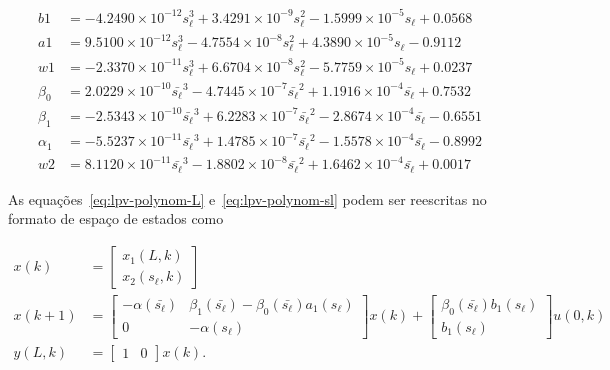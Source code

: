 \begin{equation}
	\label{eq:lpv-fs9}
	\begin{aligned}
		b1       & = -4.2490\times{}10^{-12} s_\ell^3 + 3.4291\times{}10^{-9} s_\ell^2 - 1.5999\times{}10^{-5} s_\ell + 0.0568                               \\
		a1       & = 9.5100\times{}10^{-12} s_\ell^3 - 4.7554\times{}10^{-8} s_\ell^2 + 4.3890\times{}10^{-5} s_\ell - 0.9112                                \\
		w1       & = -2.3370\times{}10^{-11} s_\ell^3 + 6.6704\times{}10^{-8} s_\ell^2 - 5.7759\times{}10^{-5} s_\ell + 0.0237                               \\
		\beta_0  & = 2.0229\times{}10^{-10} \bar{s_\ell}^3 - 4.7445\times{}10^{-7} \bar{s_\ell}^2 + 1.1916\times{}10^{-4} \bar{s_\ell} + 0.7532  \\
		\beta_1  & = -2.5343\times{}10^{-10} \bar{s_\ell}^3 + 6.2283\times{}10^{-7} \bar{s_\ell}^2 - 2.8674\times{}10^{-4} \bar{s_\ell} - 0.6551 \\
		\alpha_1 & = -5.5237\times{}10^{-11} \bar{s_\ell}^3 + 1.4785\times{}10^{-7} \bar{s_\ell}^2 - 1.5578\times{}10^{-4} \bar{s_\ell} - 0.8992 \\
		w2       & = 8.1120\times{}10^{-11} \bar{s_\ell}^3 - 1.8802\times{}10^{-8} \bar{s_\ell}^2 + 1.6462\times{}10^{-4} \bar{s_\ell} + 0.0017
	\end{aligned}
\end{equation}

As equações~\eqref{eq:lpv-polynom-L} e~\eqref{eq:lpv-polynom-sl} podem ser
reescritas no formato de espaço de estados como

\begin{equation}
	\label{eq:lpv-ss}
	\begin{aligned}
		x(k)   & =
		\begin{bmatrix}
			x_1(L,k) \\
			x_2(s_\ell,k)
		\end{bmatrix} \\
		x(k+1) & =
		\begin{bmatrix}
			-\alpha{}(\bar{s_\ell}) & \beta_1(\bar{s_\ell}) - \beta_0(\bar{s_\ell})a_1(s_\ell) \\
			0                       & -\alpha{}(s_\ell)
		\end{bmatrix}
		x(k) +
		\begin{bmatrix}
			\beta_0(\bar{s_\ell})b_1(s_\ell) \\
			b_1(s_\ell)
		\end{bmatrix}
		u(0,k)                     \\
		y(L,k) & =
		\begin{bmatrix}
			1 & 0
		\end{bmatrix}
		x(k).
	\end{aligned}
\end{equation}

